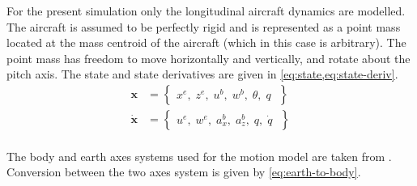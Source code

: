 \documentclass[]{article}
\begin{document}
	For the present simulation only the longitudinal aircraft dynamics are modelled. 
	The aircraft is assumed to be perfectly rigid and is represented as a point mass located at the mass centroid of the aircraft (which in this case is arbitrary). 
	The point mass has freedom to move horizontally and vertically, and rotate about the pitch axis. The state and state derivatives are given in \cref{eq:state,eq:state-deriv}.
	\\
		\begin{align}
		\mathbf{x} &= \begin{Bmatrix}
			x^e, \; z^e, \; u^b, \; w^b,\; \theta,\; q\;
		\end{Bmatrix} \label{eq:state}\\
		\dot{\mathbf{x}} &= \begin{Bmatrix}
			u^e, \; w^e, \; a_x^b, \; a_z^b,\; q,\; \dot{q}\;
		\end{Bmatrix} \label{eq:state-deriv}
	\end{align}
	\\
	The body and earth axes systems used for the motion model are taken from \cite{drela_flight_2014}. Conversion between the two axes system is given by \cref{eq:earth-to-body}.
	
\end{document}
